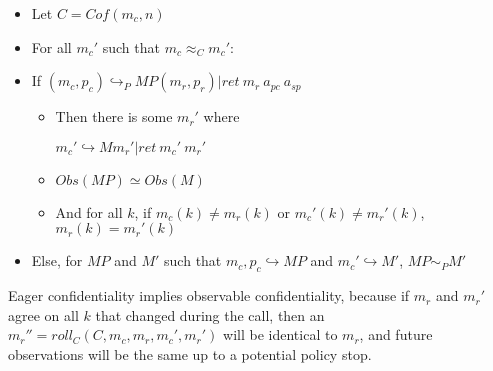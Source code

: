 \documentclass[conference]{IEEEtran}
\newcommand{\MP}{\mathit{MP}}
\begin{document}
      \begin{itemize}
        \item Let \(C = \mathit{Cof}(m_c,n)\)
        \item For all \(m_c'\) such that \(m_c \approx_C m_c'\):
        \item If \((m_c,p_c) \hookrightarrow_P \MP (m_r,p_r) | \mathit{ret}\ m_r\ a_{pc}\ a_{sp}\)
          \begin{itemize}
            \item Then there is some \(m_r'\) where
              
              \(m_c' \hookrightarrow M m_r' | \mathit{ret}\ m_c'\ m_r'\)
            \item \(\mathit{Obs}(\MP) \simeq \mathit{Obs}(M)\)
            \item And for all \(k\), if \(m_c(k) \not = m_r(k)\) or \(m_c'(k) \not = m_r'(k)\),
              \(m_r(k) = m_r'(k)\)
          \end{itemize}
        \item Else, for \(\MP\) and \(M'\) such that \(m_c,p_c \hookrightarrow \MP\) and \(m_c' \hookrightarrow M'\),
          \(\MP \sim_P M'\)
      \end{itemize}

      Eager confidentiality implies observable confidentiality, because if \(m_r\) and \(m_r'\) agree
      on all \(k\) that changed during the call, then an \(m_r'' = \mathit{roll}_C(C,m_c,m_r,m_c',m_r')\)
      will be identical to \(m_r\), and future observations will be the same up to a potential policy
      stop.
 
\end{document}
